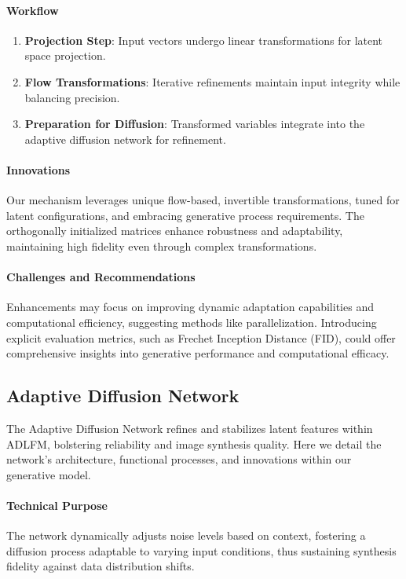 \paragraph{Workflow}
\begin{enumerate}
    \item \textbf{Projection Step}: Input vectors undergo linear transformations for latent space projection.
    \item \textbf{Flow Transformations}: Iterative refinements maintain input integrity while balancing precision.
    \item \textbf{Preparation for Diffusion}: Transformed variables integrate into the adaptive diffusion network for refinement.
\end{enumerate}

\paragraph{Innovations}
Our mechanism leverages unique flow-based, invertible transformations, tuned for latent configurations, and embracing generative process requirements. The orthogonally initialized matrices enhance robustness and adaptability, maintaining high fidelity even through complex transformations.

\paragraph{Challenges and Recommendations}
Enhancements may focus on improving dynamic adaptation capabilities and computational efficiency, suggesting methods like parallelization. Introducing explicit evaluation metrics, such as Frechet Inception Distance (FID), could offer comprehensive insights into generative performance and computational efficacy.

\subsection{Adaptive Diffusion Network}

The Adaptive Diffusion Network refines and stabilizes latent features within ADLFM, bolstering reliability and image synthesis quality. Here we detail the network's architecture, functional processes, and innovations within our generative model.

\paragraph{Technical Purpose}
The network dynamically adjusts noise levels based on context, fostering a diffusion process adaptable to varying input conditions, thus sustaining synthesis fidelity against data distribution shifts.


